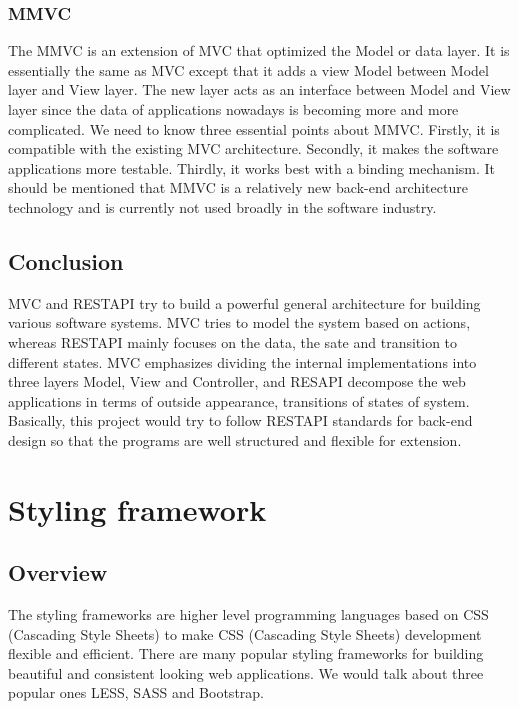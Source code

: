 \documentclass[letterpaper,10pt]{article}
\begin{document}
		\subsubsection{MMVC}
    The MMVC is an extension of MVC that optimized the Model or data layer. It is essentially the same as MVC except that it adds a view Model between Model layer and View layer. The new layer acts as an interface between Model and View layer since the data of applications nowadays is becoming more and more complicated. We need to know three essential points about MMVC. Firstly, it is compatible with the existing MVC architecture. Secondly, it makes the software applications more testable. Thirdly, it works best with a binding mechanism. It should be mentioned that MMVC is a relatively new back-end architecture technology and is currently not used broadly in the software industry.

    
	\subsection{Conclusion}
  		MVC and RESTAPI try to build a powerful general architecture for building various software systems. MVC tries to model the system based on actions, whereas RESTAPI mainly focuses on the data, the sate and transition to different states. MVC emphasizes dividing the internal implementations into three layers Model, View and Controller, and RESAPI decompose the web applications in terms of outside appearance, transitions of states of system. Basically, this project would try to follow RESTAPI standards for back-end design so that the programs are well structured and flexible for extension.


\section{Styling framework}
	\subsection{Overview}
  The styling frameworks are higher level programming languages based on CSS (Cascading Style Sheets) to make CSS (Cascading Style Sheets) development flexible and efficient. There are many popular styling frameworks for building beautiful and consistent looking web applications. We would talk about three popular ones LESS, SASS and Bootstrap.
\end{document}
